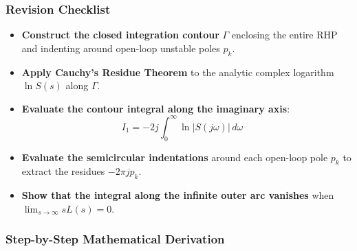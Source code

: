 \documentclass[12pt,onecolumn,twoside ]{article}
\begin{document}
	\subsubsection{Revision Checklist}
	\begin{itemize}
		\item[$\square$]
		\textbf{Construct the closed integration contour} $\Gamma$ enclosing the entire RHP and indenting around open-loop unstable poles $p_k$.
		\item[$\square$]
		\textbf{Apply Cauchy’s Residue Theorem} to the analytic complex logarithm $\ln S(s)$ along $\Gamma$.
		\item[$\square$]
		\textbf{Evaluate the contour integral along the imaginary axis}: \[
		I_1 = -2j \int_{0}^{\infty} \ln |S(j\omega)|\, d\omega \quad
		\]
		\item[$\square$]
		\textbf{Evaluate the semicircular indentations} around each open-loop pole $p_k$ to extract the residues $-2\pi j p_k$.
		\item[$\square$]
		\textbf{Show that the integral along the infinite outer arc vanishes} when $\lim_{s \to \infty} s L(s) = 0$.
	\end{itemize}
	
	\subsubsection{Step-by-Step Mathematical Derivation}
\end{document}

